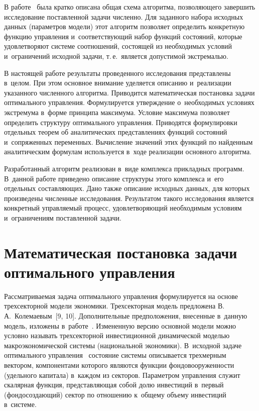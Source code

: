 \begin{multicols}{2}
В работе~\cite{1-gor} была кратко описана общая схема алгоритма, позволяющего завершить 
исследование поставленной задачи численно. Для заданного набора исходных данных 
(параметров модели) этот алгоритм позволяет определить конкретную функцию управ\-ле\-ния 
и~соответствующий набор функций состояний, которые удовлетворяют системе соотношений, 
состоящей из необходимых условий и~ограничений исходной задачи, т.\,е.\ 
является допустимой экстремалью.


В настоящей работе результаты проведенного исследования представлены 
в~целом. При этом основное внимание уделяется описанию и~реализации указанного 
численного алгоритма. Приводится математическая постановка задачи оптимального 
управ\-ле\-ния. Формулируется утверждение о~необхо\-димых условиях экстремума в~форме 
принципа максимума. Условие максимума позволяет определить структуру оптимального 
управ\-ле\-ния. Приводятся формулировки отдельных теорем об аналитических представлениях 
функций состояний и~сопряженных переменных. Вычисление значений этих функций по 
найденным аналитическим формулам используется в~ходе реализации основного алго\-ритма.

Разработанный алгоритм реализован в~виде комплекса прикладных программ. 
В~данной работе приведено описание структуры этого комплекса и~его отдельных 
составляющих. Дано также описание исходных данных, для которых произведены численные 
исследования. Результатом такого исследования является конкретный управ\-ля\-емый процесс, 
удовлетворяющий необходимым условиям и~ограничениям поставленной задачи.

\section{Математическая постановка задачи оптимального управления}

Рассматриваемая задача оптимального управ\-ле\-ния формулируется на основе 
трехсекторной модели экономики. Трехсекторная модель предложена 
В.\,А.~Колемаевым~[9, 10]. Дополнительные предположения, внесенные в~данную модель, 
изложены в~работе~\cite{2-gor}. Измененную версию основной модели можно условно 
называть трехсекторной инвестиционной динамической моделью макроэкономической 
системы (национальной экономики). В~исходной задаче оптимального управ\-ле\-ния~\cite{2-gor} 
состояние системы описывается трехмерным вектором, компонентами которого являются 
функции фондовооруженности (удельного капитала) в~каж\-дом из секторов. Параметром 
управ\-ле\-ния служит скалярная функция, представляющая собой долю инвестиций в~первый 
(фондосоздающий) сектор по отношению к~общему объему инвестиций в~сис\-теме.


\end{multicols}
